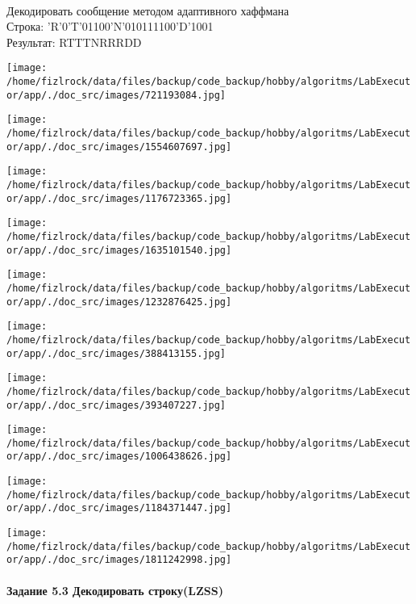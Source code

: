 \documentclass[a4paper, 12pt]{article}
\begin{document}
\\ 

Декодировать сообщение методом адаптивного хаффмана \\
Строка: 
'R'0'T'01100'N'010111100'D'1001\\
Результат: RTTTNRRRDD

\texttt{[image: /home/fizlrock/data/files/backup/code\_backup/hobby/algoritms/LabExecutor/app/./doc\_src/images/721193084.jpg]}

\texttt{[image: /home/fizlrock/data/files/backup/code\_backup/hobby/algoritms/LabExecutor/app/./doc\_src/images/1554607697.jpg]}

\texttt{[image: /home/fizlrock/data/files/backup/code\_backup/hobby/algoritms/LabExecutor/app/./doc\_src/images/1176723365.jpg]}

\texttt{[image: /home/fizlrock/data/files/backup/code\_backup/hobby/algoritms/LabExecutor/app/./doc\_src/images/1635101540.jpg]}

\texttt{[image: /home/fizlrock/data/files/backup/code\_backup/hobby/algoritms/LabExecutor/app/./doc\_src/images/1232876425.jpg]}

\texttt{[image: /home/fizlrock/data/files/backup/code\_backup/hobby/algoritms/LabExecutor/app/./doc\_src/images/388413155.jpg]}

\texttt{[image: /home/fizlrock/data/files/backup/code\_backup/hobby/algoritms/LabExecutor/app/./doc\_src/images/393407227.jpg]}

\texttt{[image: /home/fizlrock/data/files/backup/code\_backup/hobby/algoritms/LabExecutor/app/./doc\_src/images/1006438626.jpg]}

\texttt{[image: /home/fizlrock/data/files/backup/code\_backup/hobby/algoritms/LabExecutor/app/./doc\_src/images/1184371447.jpg]}

\texttt{[image: /home/fizlrock/data/files/backup/code\_backup/hobby/algoritms/LabExecutor/app/./doc\_src/images/1811242998.jpg]}
\pagebreak
\paragraph{Задание 5.3 Декодировать строку(LZSS)\\}
\end{document}

